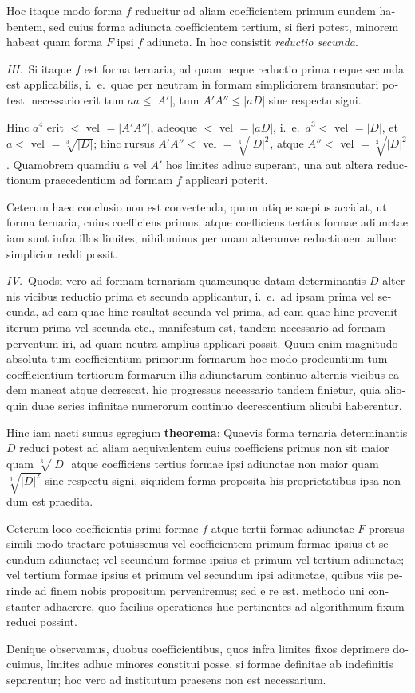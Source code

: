 \documentclass[12pt,a4paper]{article}
\theoremstyle{plain}
\theoremstyle{definition}
\theoremstyle{remark}
\begin{document}
\begin{otherlanguage}{latin}
Hoc itaque modo forma $f$ reducitur ad aliam coefficientem primum eundem habentem, sed cuius forma adiuncta coefficientem tertium, si fieri potest, minorem habeat quam forma $F$ ipsi $f$ adiuncta. In hoc consistit \emph{reductio secunda}.

\textit{III.}\ Si itaque $f$ est forma ternaria, ad quam neque reductio prima neque secunda est applicabilis, i.\ e.\ quae per neutram in formam simpliciorem transmutari potest: necessario erit tum $aa \leq |A'|$, tum $A'A'' \leq |aD|$ sine respectu signi.

Hinc $a^4$ erit $<$ vel $= |A'A''|$, adeoque $<$ vel $= |aD|$, i.\ e.\ $a^3 <$ vel $= |D|$, et $a <$ vel $= \sqrt[3]{|D|}$; hinc rursus $A'A'' <$ vel $= \sqrt[3]{|D|^2}$, atque $A'' <$ vel $= \sqrt[3]{|D|^2}$. Quamobrem quamdiu $a$ vel $A'$ hos limites adhuc superant, una aut altera reductionum praecedentium ad formam $f$ applicari poterit.

Ceterum haec conclusio non est convertenda, quum utique saepius accidat, ut forma ternaria, cuius coefficiens primus, atque coefficiens tertius formae adiunctae iam sunt infra illos limites, nihilominus per unam alteramve reductionem adhuc simplicior reddi possit.

\textit{IV.}\ Quodsi vero ad formam ternariam quamcunque datam determinantis $D$ alternis vicibus reductio prima et secunda applicantur, i.\ e.\ ad ipsam prima vel secunda, ad eam quae hinc resultat secunda vel prima, ad eam quae hinc provenit iterum prima vel secunda etc., manifestum est, tandem necessario ad formam perventum iri, ad quam neutra amplius applicari possit. Quum enim magnitudo absoluta tum coefficientium primorum formarum hoc modo prodeuntium tum coefficientium tertiorum formarum illis adiunctarum continuo alternis vicibus eadem maneat atque decrescat, hic progressus necessario tandem finietur, quia alioquin duae series infinitae numerorum continuo decrescentium alicubi haberentur.

Hinc iam nacti sumus egregium \textbf{theorema}: Quaevis forma ternaria determinantis $D$ reduci potest ad aliam aequivalentem cuius coefficiens primus non sit maior quam $\sqrt[3]{|D|}$ atque coefficiens tertius formae ipsi adiunctae non maior quam $\sqrt[3]{|D|^2}$ sine respectu signi, siquidem forma proposita his proprietatibus ipsa nondum est praedita.

Ceterum loco coefficientis primi formae $f$ atque tertii formae adiunctae $F$ prorsus simili modo tractare potuissemus vel coefficientem primum formae ipsius et secundum adiunctae; vel secundum formae ipsius et primum vel tertium adiunctae; vel tertium formae ipsius et primum vel secundum ipsi adiunctae, quibus viis perinde ad finem nobis propositum perveniremus; sed e re est, methodo uni constanter adhaerere, quo facilius operationes huc pertinentes ad algorithmum fixum reduci possint.

Denique observamus, duobus coefficientibus, quos infra limites fixos deprimere docuimus, limites adhuc minores constitui posse, si formae definitae ab indefinitis separentur; hoc vero ad institutum praesens non est necessarium.

\end{otherlanguage}
\end{document}
